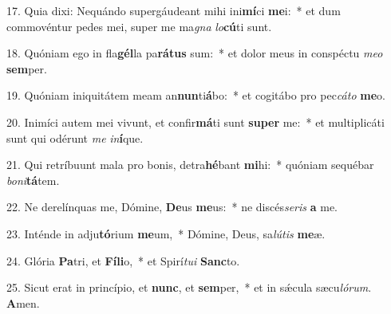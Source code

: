 17. Quia dixi: Nequándo supergáudeant mihi ini\textbf{mí}ci \textbf{me}i:~*  et dum commovéntur pedes mei, super me ma\textit{gna} \textit{lo}\textbf{cú}ti sunt.\

18. Quóniam ego in fla\textbf{gél}la pa\textbf{rá}\textbf{tus} sum:~*  et dolor meus in conspéctu \textit{me}\textit{o} \textbf{sem}per.\

19. Quóniam iniquitátem meam an\textbf{nun}ti\textbf{á}bo:~*  et cogitábo pro pec\textit{cá}\textit{to} \textbf{me}o.\

20. Inimíci autem mei vivunt, et confir\textbf{má}ti sunt \textbf{su}\textbf{per} me:~*  et multiplicáti sunt qui odérunt \textit{me} \textit{in}\textbf{í}que.\

21. Qui retríbuunt mala pro bonis, detra\textbf{hé}bant \textbf{mi}hi:~*  quóniam sequébar \textit{bo}\textit{ni}\textbf{tá}tem.\

22. Ne derelínquas me, Dómine, \textbf{De}us \textbf{me}us:~*  ne discés\textit{se}\textit{ris} \textbf{a} me.\

23. Inténde in adju\textbf{tó}rium \textbf{me}um,~*  Dómine, Deus, sa\textit{lú}\textit{tis} \textbf{me}æ.\

24. Glória \textbf{Pa}tri, et \textbf{Fí}\textbf{li}o,~*  et Spirí\textit{tu}\textit{i} \textbf{Sanc}to.\

25. Sicut erat in princípio, et \textbf{nunc}, et \textbf{sem}per,~*  et in sǽcula sæcu\textit{ló}\textit{rum}. \textbf{A}men.\

